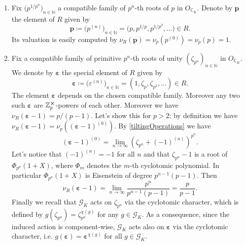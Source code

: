 \begin{ex}[]\leavevmode\vspace{-.2\baselineskip}\label{ExampleEltsTilt}
\begin{enumerate}
\item Fix $\big( p^{1/p^n} \big)_{n \in \mathbb{N}}$ 
	a compatible family of $p^n$-th roots of $p$
	in $O_{\mathbb{C}_K}$.
	Denote by $\mathbf{p}$ the element of $R$ given by
	\begin{equation*}
		\mathbf{p} \coloneqq \big( p^{(n)} \big)_{n \in \mathbb{N}} =
		\big( p, p^{1/p}, p^{1/p^2}, \ldots \big) \in R
	.\end{equation*}
	Its valuation is easily computed by
	$\nu_R(\mathbf{p}) = \nu_p(p^{(0)}) = \nu_p(p) = 1$.

\item Fix a compatible family of primitive $p^n$-th roots of unity
	$\left( \zeta_{p^n} \right)_{n \in \mathbb{N}}$ in $O_{\mathbb{C}_K}$.
	We denote by $\boldsymbol\varepsilon$ the special element of $R$ given by
	\begin{equation*}
		\boldsymbol\varepsilon \coloneqq \big( \varepsilon^{(n)} \big)_{n \in \mathbb{N}} =
		\left( 1, \zeta_p, \zeta_{p^2}, \ldots \right) \in R
	.\end{equation*}
	The element $\boldsymbol\varepsilon$ depends on the chosen
	compatible family.
	Moreover any two such $\boldsymbol\varepsilon$
	are $\mathbb{Z}_{p}^{\cross}$-powers of each other.
	Moreover we have
	$\nu_R \left( \boldsymbol\varepsilon - 1 \right) = p/ (p - 1)$.
	Let's show this for $p > 2$: by definition we have
	$\nu_R(\boldsymbol\varepsilon - 1) = \nu_p \left( (\boldsymbol\varepsilon -1 )^{(0)} \right)$.
	By \cref{tiltingOperations} we have
	\begin{equation*}
		\left( \boldsymbol\varepsilon -1 \right)^{(0)} =
		\lim_{n \to \infty} \left( \zeta_{p^n} + (-1)^{(n)} \right)^{p^n}
	.\end{equation*}
	Let's notice that $\left( -1 \right)^{(n)} = -1$ for all $n$
	and that $\zeta_{p^n} - 1$ is a root of $\Phi_{p^n}(1+X)$,
	where $\Phi_m$ denotes the $m$-th cyclotomic polynomial.
	In particular $\Phi_{p^n}(1+X)$ is Eisenstein of degree
	$p^{n-1}(p-1)$.
	Then
	\begin{equation*}
		\nu_R(\boldsymbol\varepsilon - 1) =
		\lim_{n \to \infty} \frac{ p^n }{ p^{n-1}(p-1) } =
		\frac{ p }{ p-1 }
	.\end{equation*}
	Finally we recall that $\mathscr{G}_K$ acts on $\zeta_{p^n}$ via
	the cyclotomic character, which is defined by
	$g(\zeta_{p^n}) = \zeta_{p^n}^{\chi(g)}$ for any $g \in \mathscr{G}_K$.
	As a consequence, since the induced action is component-wise,
	$\mathscr{G}_K$ acts also on $\boldsymbol\varepsilon$ via the cyclotomic character,
	i.e. $g(\boldsymbol\varepsilon) = \boldsymbol\varepsilon^{\chi(g)}$
	for all $g \in \mathscr{G}_K$.
\end{enumerate}
\end{ex}



